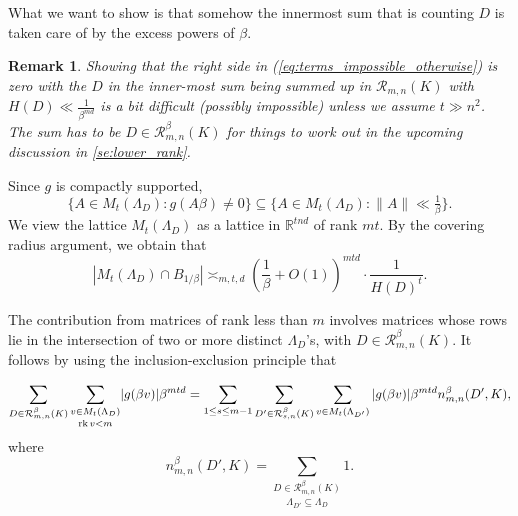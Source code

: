 \documentclass{amsart}
\newtheorem{remark}[theorem]{Remark}
\newcommand{\R}{\mathbb{R}}
\DeclareMathOperator{\rank}{rk}
\begin{document}
 What we want to show is that somehow the innermost sum that is counting $D$ is taken care of by the excess powers of $\beta$.
 




 \begin{remark}
	 Showing that the right side in (\ref{eq:terms_impossible_otherwise}) 
	 is zero with the $D$ in the inner-most sum being summed up in $\mathcal{R}_{m,n}(K)$ with $H(D) \ll \tfrac{1}{\beta^{md}}$
	 is a bit difficult (possibly impossible) unless we assume $t \gg n^{2}$. The sum has to be $D \in \mathcal{R}^{\beta}_{m,n}(K)$ for things to work out in the upcoming discussion in \ref{se:lower_rank}.
 \end{remark}
\fi


Since $g$ is compactly supported,$$\{A\in M_t(\Lambda_D):g(A\beta)\neq0\}\subseteq\{A\in M_t(\Lambda_D):\lVert A\rVert\ll\tfrac{1}{\beta}\}.$$We view the lattice $M_t(\Lambda_D)$ as a lattice in $\R^{tnd}$ of rank $mt$. By the covering radius argument, we obtain that
\begin{equation}\left|M_t(\Lambda_D)\cap B_{1/\beta} \right|\asymp_{m,t,d}
\left(
\frac{1}{\beta } + O(1)
\right)^{mtd} \cdot
\frac{1}{H(D)^t}.
\end{equation}





The contribution from matrices of rank less than $m$ involves matrices whose rows lie in the intersection of two or more distinct $\Lambda_D$'s, with $D\in\mathcal{R}_{m,n}^{\beta}(K)$. It follows by using the inclusion-exclusion principle that

{\small $$
\sum_{D\in\mathcal{R}_{m,n}^{\beta}(K)}\underset{\rank v<m}{\sum_{v\in M_t(\Lambda_D)}}|g(\beta v)|\beta^{mtd}\\=\sum_{1\le s\le m-1}\sum_{D'\in\mathcal{R}_{s,n}^{\beta}(K)}\sum_{v\in M_t(\Lambda_{D'})}|g(\beta v)|\beta^{mtd}n^{\beta}_{m,n}(D',K),
$$where$$n^{\beta}_{m,n}(D',K)=\underset{\Lambda_{D'}\subseteq\Lambda_D}{\sum_{D\in\mathcal{R}_{m,n}^{\beta}(K)}}1.$$}
\end{document}
